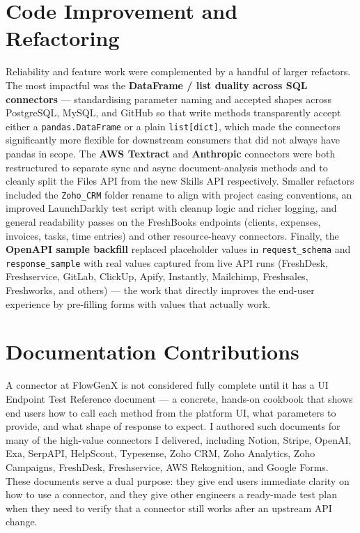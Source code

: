 \section{Code Improvement and Refactoring}
Reliability and feature work were complemented by a handful of
larger refactors. The most impactful was the \textbf{DataFrame /
list duality across SQL connectors} --- standardising parameter
naming and accepted shapes across PostgreSQL, MySQL, and GitHub so
that write methods transparently accept either a
\texttt{pandas.DataFrame} or a plain \texttt{list[dict]}, which
made the connectors significantly more flexible for downstream
consumers that did not always have pandas in scope. The
\textbf{AWS Textract} and \textbf{Anthropic} connectors were both
restructured to separate sync and async document-analysis methods
and to cleanly split the Files API from the new Skills API
respectively. Smaller refactors included the \texttt{Zoho\_CRM}
folder rename to align with project casing conventions, an
improved LaunchDarkly test script with cleanup logic and richer
logging, and general readability passes on the FreshBooks endpoints
(clients, expenses, invoices, tasks, time entries) and other
resource-heavy connectors. Finally, the \textbf{OpenAPI sample
backfill} replaced placeholder values in \texttt{request\_schema}
and \texttt{response\_sample} with real values captured from live
API runs (FreshDesk, Freshservice, GitLab, ClickUp, Apify, Instantly,
Mailchimp, Freshsales, Freshworks, and others) --- the work that
directly improves the end-user experience by pre-filling forms with
values that actually work.

\section{Documentation Contributions}
A connector at FlowGenX is not considered fully complete until it has
a UI Endpoint Test Reference document --- a concrete, hands-on
cookbook that shows end users how to call each method from the
platform UI, what parameters to provide, and what shape of response
to expect. I authored such documents for many of the high-value
connectors I delivered, including Notion, Stripe, OpenAI, Exa,
SerpAPI, HelpScout, Typesense, Zoho CRM, Zoho Analytics, Zoho
Campaigns, FreshDesk, Freshservice, AWS Rekognition, and Google
Forms. These documents serve a dual purpose: they give end users
immediate clarity on how to use a connector, and they give other
engineers a ready-made test plan when they need to verify that a
connector still works after an upstream API change.

